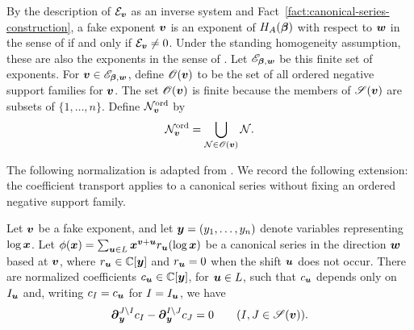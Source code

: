 By the description of \(\mathcal E_{\boldsymbol{v}}\) as an inverse system and Fact~\ref{fact:canonical-series-construction}, a fake exponent \(\boldsymbol{v}\) is an exponent of \(H_A(\boldsymbol{\beta})\) with respect to \(\boldsymbol{w}\) in the sense of \cite{Sai20} if and only if \(\mathcal E_{\boldsymbol{v}}\ne0\).
Under the standing homogeneity assumption, these are also the exponents in the sense of \cite[Definition~2.9]{DMM12}.
Let \(\mathscr E_{\boldsymbol{\beta},\boldsymbol{w}}\) be this finite set of exponents.
For \(\boldsymbol{v}\in\mathscr E_{\boldsymbol{\beta},\boldsymbol{w}}\), define \(\mathscr O(\boldsymbol{v})\) to be the set of all ordered negative support families for \(\boldsymbol{v}\).
The set \(\mathscr O(\boldsymbol{v})\) is finite because the members of \(\mathscr S(\boldsymbol{v})\) are subsets of \(\{1,\ldots,n\}\).
Define \(\mathcal N_{\boldsymbol{v}}^{\mathrm{ord}}\) by
\begin{equation}
	\mathcal N_{\boldsymbol{v}}^{\mathrm{ord}}
	=
	\bigcup_{\mathcal N\in\mathscr O(\boldsymbol{v})}\mathcal N.
	\label{eq:largest-ordered-family}
\end{equation}

The following normalization is adapted from \cite[Lemmas~4.1 and~4.2, and Proposition~4.3]{OS25}.
We record the following extension: the coefficient transport applies to a canonical series without fixing an ordered negative support family.

\begin{lemma}
	\label{lem:coefficient-transport}
	Let \(\boldsymbol{v}\) be a fake exponent, and let \(\boldsymbol{y}=(y_1,\ldots,y_n)\) denote variables representing \(\log\boldsymbol{x}\).
	Let \(\phi(\boldsymbol{x})=\sum_{\boldsymbol{u}\in L}\boldsymbol{x}^{\boldsymbol{v}+\boldsymbol{u}}r_{\boldsymbol{u}}(\log\boldsymbol{x})\) be a canonical series in the direction \(\boldsymbol{w}\) based at \(\boldsymbol{v}\), where \(r_{\boldsymbol{u}}\in\mathbb C[\boldsymbol{y}]\) and \(r_{\boldsymbol{u}}=0\) when the shift \(\boldsymbol{u}\) does not occur.
	There are normalized coefficients \(c_{\boldsymbol{u}}\in\mathbb C[\boldsymbol{y}]\), for \(\boldsymbol{u}\in L\), such that \(c_{\boldsymbol{u}}\) depends only on \(I_{\boldsymbol{u}}\) and, writing \(c_I=c_{\boldsymbol{u}}\) for \(I=I_{\boldsymbol{u}}\), we have
	\begin{equation}
		\boldsymbol{\partial}_{\boldsymbol{y}}^{J\setminus I}c_I
		-
		\boldsymbol{\partial}_{\boldsymbol{y}}^{I\setminus J}c_J
		=0
		\qquad
		(I,J\in\mathscr S(\boldsymbol{v})).
		\label{eq:coefficient-transport}
	\end{equation}
\end{lemma}


